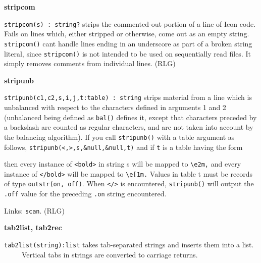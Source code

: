 {\sffamily\bfseries
stripcom}

\texttt{stripcom(s) : string?} strips the commented-out portion of a
line of Icon code. Fails on lines which, either stripped or otherwise,
come out as an empty string. \texttt{stripcom()} can{\textquotesingle}t
handle lines ending in an underscore as part of a broken string
literal, since \texttt{stripcom()} is not intended to be used on
sequentially read files. It simply removes comments from
individual lines. (RLG)

{\sffamily\bfseries
stripunb}

\texttt{stripunb(c1,c2,s,i,j,t:table) : string} strips material from a
line which is unbalanced with respect to the characters defined in
arguments 1 and 2 (unbalanced being defined as \texttt{bal()} defines
it, except that characters preceded by a backslash are counted as
regular characters, and are not taken into account by the balancing
algorithm). If you call \texttt{stripunb()} with a table argument as
follows,
\texttt{stripunb({\textquotesingle}{\textless}{\textquotesingle},{\textquotesingle}{\textgreater}{\textquotesingle},s,\&null,\&null,t)}
and if \texttt{t} is a table having the form

\iconcode{
key: {\textquotedbl}bold{\textquotedbl} value:
outstr({\textquotedbl}{\textbackslash}e[2m{\textquotedbl},
{\textquotedbl}{\textbackslash}e1m{\textquotedbl})}

\iconcode{
key: {\textquotedbl}underline{\textquotedbl} value:
outstr({\textquotedbl}{\textbackslash}e[4m{\textquotedbl},
{\textquotedbl}{\textbackslash}e1m{\textquotedbl}) etc.}

then every instance of
\texttt{{\textquotedbl}{\textless}bold{\textgreater}{\textquotedbl}} in
string s will be mapped to
\texttt{{\textquotedbl}{\textbackslash}e2m,{\textquotedbl}} and every
instance of
\texttt{{\textquotedbl}{\textless}/bold{\textgreater}{\textquotedbl}}
will be mapped to
\texttt{{\textquotedbl}{\textbackslash}e[1m.{\textquotedbl}} Values in
table t must be records of type \texttt{outstr(on, off)}. When
\texttt{{\textquotedbl}{\textless}/{\textgreater}{\textquotedbl}} is
encountered, \texttt{stripunb()} will output the \texttt{.off} value
for the preceding \texttt{.on} string encountered.

Links: \texttt{scan}. (RLG)

{\sffamily\bfseries
tab2list, tab2rec}

\texttt{tab2list(string):list} takes tab-separated strings and inserts
them into a list.\\
 \ \ \ \ \ Vertical tabs in strings are converted to carriage returns.

